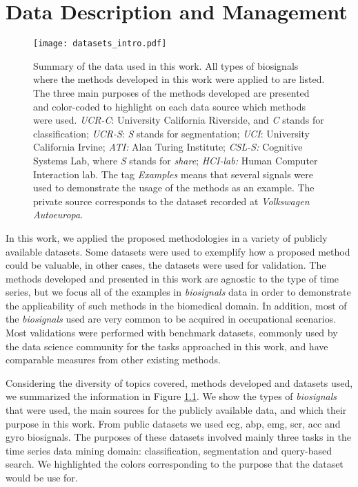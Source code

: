 
%

\chapter{Data Description and Management}
\label{cha:data}

\begin{figure}
\centering
\texttt{[image: datasets\_intro.pdf]}
\caption{Summary of the data used in this work. All types of biosignals where the methods developed in this work were applied to are listed. The three main purposes of the methods developed are presented and color-coded to highlight on each data source which methods were used. \textit{UCR-C}: University California Riverside, and \textit{C} stands for classification; \textit{UCR-S}: \textit{S} stands for segmentation; \textit{UCI}: University California Irvine; \textit{ATI:} Alan Turing Institute; \textit{CSL-S:} Cognitive Systems Lab, where \textit{S} stands for \textit{share}; \textit{HCI-lab:} Human Computer Interaction lab. The tag \textit{Examples} means that several signals were used to demonstrate the usage of the methods as an example. The private source corresponds to the dataset recorded at \textit{Volkswagen Autoeuropa}.}
\label{fig:intro_datasets}
\end{figure}

In this work, we applied the proposed methodologies in a variety of publicly available datasets. Some datasets were used to exemplify how a proposed method could be valuable, in other cases, the datasets were used for validation. The methods developed and presented in this work are agnostic to the type of time series, but we focus all of the examples in \textit{biosignals} data in order to demonstrate the applicability of such methods in the biomedical domain. In addition, most of the \textit{biosignals} used are very common to be acquired in occupational scenarios. Most validations were performed with benchmark datasets, commonly used by the data science community for the tasks approached in this work, and have comparable measures from other existing methods.

Considering the diversity of topics covered, methods developed and datasets used, we summarized the information in Figure \ref{fig:intro_datasets}. We show the types of \textit{biosignals} that were used, the main sources for the publicly available data, and which their purpose in this work. From public datasets we used \gls{ecg}, \gls{abp}, \gls{emg}, \gls{scr}, \gls{acc} and \gls{gyro} biosignals. The purposes of these datasets involved mainly three tasks in the time series data mining domain: classification, segmentation and query-based search. We highlighted the colors corresponding to the purpose that the dataset would be use for. 

